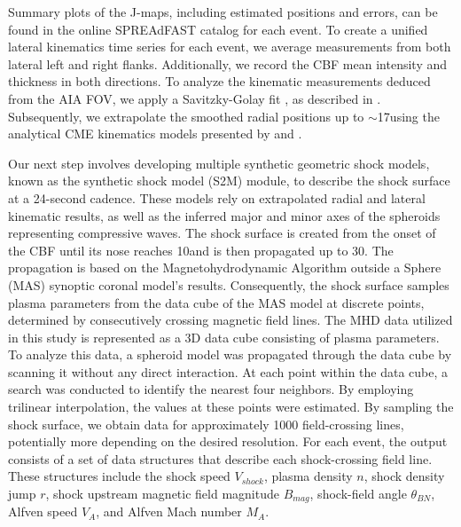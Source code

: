 Summary plots of the J-maps, including estimated positions and errors, can be found in the online SPREAdFAST catalog for each event. To create a unified lateral kinematics time series for each event, we average measurements from both lateral left and right flanks. Additionally, we record the CBF mean intensity and thickness in both directions.
To analyze the kinematic measurements deduced from the AIA FOV, we apply a Savitzky-Golay fit \citep{savitzky_1964}, as described in \citet{kozarev_2019}. Subsequently, we extrapolate the smoothed radial positions up to $\sim$17\rsun using the analytical CME kinematics models presented by \citet{gallagher_2003} and \citet{byrne_2013}.

Our next step involves developing multiple synthetic geometric shock models, known as the synthetic shock model (S2M) module, to describe the shock surface at a 24-second cadence. These models rely on extrapolated radial and lateral kinematic results, as well as the inferred major and minor axes of the spheroids representing compressive waves. The shock surface is created from the onset of the CBF until its nose reaches 10\rsun and is then propagated up to 30\rsun. The propagation is based on the Magnetohydrodynamic Algorithm outside a Sphere (MAS) synoptic coronal model's results. Consequently, the shock surface samples plasma parameters from the data cube of the MAS model at discrete points, determined by consecutively crossing magnetic field lines.
The MHD data utilized in this study is represented as a 3D data cube consisting of plasma parameters. To analyze this data, a spheroid model was propagated through the data cube by scanning it without any direct interaction. At each point within the data cube, a search was conducted to identify the nearest four neighbors. By employing trilinear interpolation, the values at these points were estimated.
By sampling the shock surface, we obtain data for approximately 1000 field-crossing lines, potentially more depending on the desired resolution. For each event, the output consists of a set of data structures that describe each shock-crossing field line. These structures include the shock speed $V_{shock}$, plasma density $n$, shock density jump $r$, shock upstream magnetic field magnitude $B_{mag}$, shock-field angle $\theta_{BN}$, Alfven speed $V_A$, and Alfven Mach number $M_A$.

